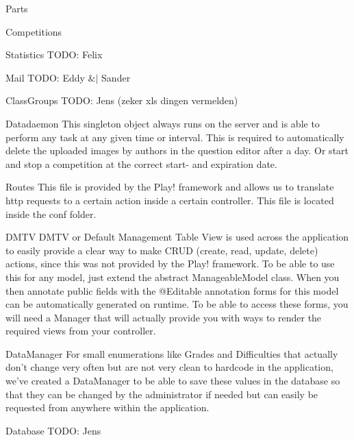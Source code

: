 \documentclass[]{article}
\begin{document}
\begin{section}{Parts}
\begin{subsection}{Competitions}
    \end{subsection}
    \begin{subsection}{Statistics}
        TODO: Felix
    \end{subsection}
    \begin{subsection}{Mail}
        TODO: Eddy $\&|$ Sander
    \end{subsection}
    \begin{subsection}{ClassGroups}
        TODO: Jens (zeker xls dingen vermelden)
    \end{subsection}
    \begin{subsection}{Datadaemon}
        This singleton object always runs on the server and is able to perform
        any task at any given time or interval. This is required to automatically delete
        the uploaded images by authors in the question editor after a day. Or start and
        stop a competition at the correct start- and expiration date.
    \end{subsection}
    \begin{subsection}{Routes}
        This file is provided by the Play! framework and allows us to translate http requests
        to a certain action inside a certain controller.
        This file is located inside the conf folder.
    \end{subsection}
    \begin{subsection}{DMTV}
        DMTV or Default Management Table View is used across the application to easily
        provide a clear way to make CRUD (create, read, update, delete) actions, since this
        was not provided by the Play! framework.
        To be able to use this for any model, just extend the abstract ManageableModel class.
        When you then annotate public fields with the @Editable annotation forms for this model
        can be automatically generated on runtime. To be able to access these forms, you will
        need a Manager that will actually provide you with ways to render the required
        views from your controller.
    \end{subsection}
    \begin{subsection}{DataManager}
        For small enumerations like Grades and Difficulties that actually don't change very
        often but are not very clean to hardcode in the application, we've created a DataManager
        to be able to save these values in the database so that they can be changed by the
        administrator if needed but can easily be requested from anywhere within the application.
    \end{subsection}
    \begin{subsection}{Database}
        TODO: Jens
    \end{subsection}
\end{section}
\end{document}
